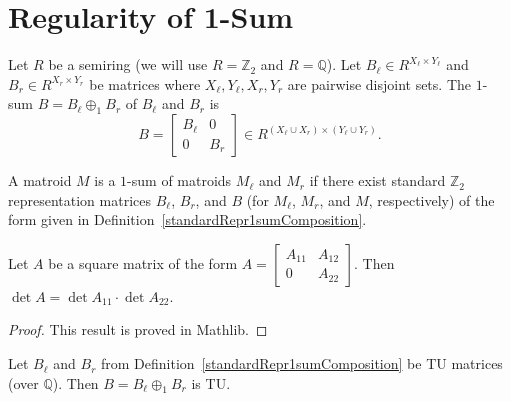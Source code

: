 \chapter{Regularity of 1-Sum}

\begin{definition}
    \label{standardRepr1sumComposition}
    \leanok
    Let $R$ be a semiring (we will use $R = \mathbb{Z}_{2}$ and $R = \mathbb{Q}$). Let $B_{\ell} \in R^{X_{\ell} \times Y_{\ell}}$ and $B_{r} \in R^{X_{r} \times Y_{r}}$ be matrices where $X_{\ell}, Y_{\ell}, X_{r}, Y_{r}$ are pairwise disjoint sets. The $1$-sum $B = B_{\ell} \oplus_{1} B_{r}$ of $B_{\ell}$ and $B_{r}$ is
    \[
        B = \begin{bmatrix} B_{\ell} & 0 \\ 0 & B_{r} \end{bmatrix} \in R^{(X_{\ell} \cup X_{r}) \times (Y_{\ell} \cup Y_{r})}.
    \]
\end{definition}

\begin{definition}
    \label{Matroid.Is1sumOf}
    \leanok
    A matroid $M$ is a $1$-sum of matroids $M_{\ell}$ and $M_{r}$ if there exist standard $\mathbb{Z}_{2}$ representation matrices $B_{\ell}$, $B_{r}$, and $B$ (for $M_{\ell}$, $M_{r}$, and $M$, respectively) of the form given in Definition~\ref{standardRepr1sumComposition}.
\end{definition}

\begin{lemma}
    \label{Matrix.det_fromBlocks_zero}
    \leanok
    Let $A$ be a square matrix of the form $A = \begin{bmatrix} A_{11} & A_{12} \\ 0 & A_{22} \end{bmatrix}$. Then $\det A = \det A_{11} \cdot \det A_{22}$.
\end{lemma}

\begin{proof}
    \leanok
    This result is proved in Mathlib.
\end{proof}

\begin{lemma}
    \label{Matrix.fromBlocks_isTotallyUnimodular}
    \leanok
    Let $B_{\ell}$ and $B_{r}$ from Definition~\ref{standardRepr1sumComposition} be TU matrices (over $\mathbb{Q}$). Then $B = B_{\ell} \oplus_{1} B_{r}$ is TU.
\end{lemma}

